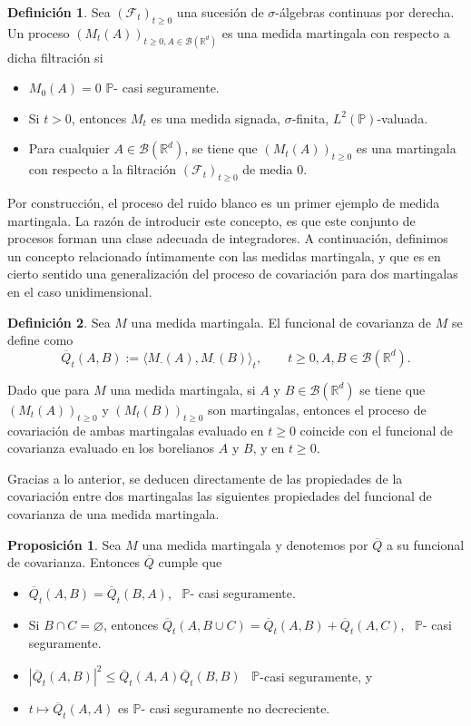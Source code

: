 \documentclass[letterpaper,twoside,12pt]{book}
\newcommand{\R}{\mathbb{R}}
\newcommand{\F}{\mathcal{F}}
\newcommand{\B}{\mathcal{B}}
\renewcommand{\P}{\mathbb{P}}
\newcommand{\1}{\mathds{1}}
\newcommand{\abs}[1]{\left\lvert #1 \right\rvert}
\theoremstyle{definition}
\newtheorem{dfn}{Definición}
\theoremstyle{definition}
\theoremstyle{definition}
\theoremstyle{definition}
\newtheorem{prop}{Proposición}
\theoremstyle{definition}
\theoremstyle{definition}
\theoremstyle{definition}
\begin{document}
\begin{dfn} 
 Sea $(\F_t)_{t\geq0}$ una sucesión de $\sigma$-álgebras continuas por derecha. Un proceso $(M_t(A))_{t\geq0, A\in \B(\R^{d})}$ es una medida martingala con respecto a dicha filtración si 
 \begin{itemize}
    \item $M_0(A)=0$ $\P$- casi seguramente.
    \item Si $t>0$, entonces $M_t$ es una medida signada, $\sigma$-finita, $L^{2}(\P)$-valuada.
    \item Para cualquier $A\in \B(\R^{d})$, se tiene que $(M_t(A))_{t\geq0}$ es una martingala con respecto a la filtración $(\F_t)_{t\geq0}$ de media 0.
 \end{itemize}
 \end{dfn}
 Por construcción, el proceso del ruido blanco es un primer ejemplo de medida martingala. La razón de introducir este concepto, es que este conjunto de procesos forman una clase adecuada de integradores. A continuación, definimos un concepto relacionado íntimamente con las medidas martingala, y que es en cierto sentido una generalización del proceso de covariación para dos martingalas en el caso unidimensional.

 \begin{dfn} 
  Sea $M$ una medida martingala. El funcional de covarianza de $M$ se define como
  \[
  \overline{Q}_t(A,B):= \langle M_\cdot(A),M_\cdot (B)\rangle_t, \qquad t\geq 0, A, B \in \B(\R^{d}). 
  \]
  \end{dfn}
  Dado que para $M$ una medida martingala, si $A$ y $B \in \B(\R^{d})$ se tiene que $(M_t(A))_{t\geq0}$ y $(M_t(B))_{t\geq0}$ son martingalas, entonces el proceso de covariación de ambas martingalas evaluado en $t\geq0$ coincide con el funcional de covarianza evaluado en los borelianos $A$ y $B$, y en $t\geq0$.

  Gracias a lo anterior, se deducen directamente de las propiedades de la covariación entre dos martingalas las siguientes propiedades del funcional de covarianza de una medida martingala.

  \begin{prop} 
   Sea $M$ una medida martingala y denotemos por $\overline{Q}$ a su funcional de covarianza. Entonces $\overline{Q}$ cumple que
   \begin{itemize}
    \item $\overline{Q}_t(A,B)=\overline{Q}_t(B,A)$, \ $\P$- casi seguramente.
    \item Si $B\cap C=\varnothing$, entonces $\overline{Q}_t(A,B\cup C)=\overline{Q}_t(A,B)+\overline{Q}_t(A,C)$, \ $\P$- casi seguramente.
    \item $\abs{\overline{Q}_t(A,B)}^2\leq \overline{Q}_t(A,A)\overline{Q}_t(B,B)$ \ $\P$-casi seguramente, y 
    \item $t\mapsto\overline{Q}_t(A,A)$ es $\P$- casi seguramente no decreciente.
   \end{itemize}
   \end{prop}
\end{document}

